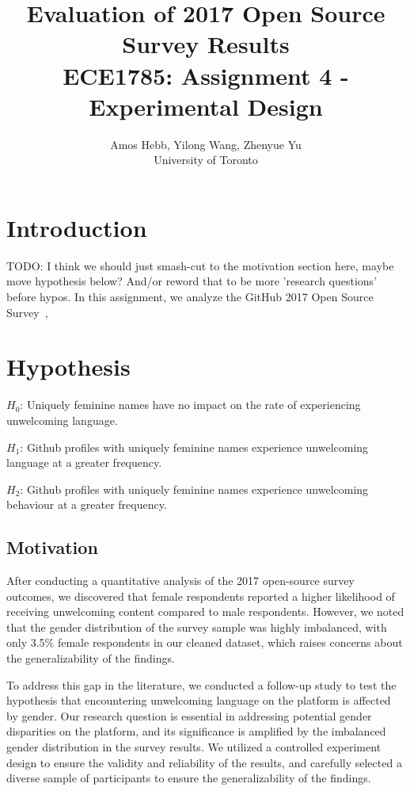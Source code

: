 \documentclass[journal,12pt,onecolumn,]{IEEEtran}
\begin{document}
\title{Evaluation of 2017 Open Source Survey Results \\
{\normalsize ECE1785: Assignment 4 - Experimental Design}}

\author{Amos Hebb, Yilong Wang, Zhenyue Yu\\ \small University of Toronto}

\maketitle

\section{Introduction}

TODO: I think we should just smash-cut to the motivation section here, maybe move hypothesis below? And/or reword that to be more 'research questions' before hypos.
In this assignment, we analyze the GitHub 2017 Open Source Survey~\cite{gitHubOpenSourceSurvey},

\section{Hypothesis}

$H_0$: Uniquely feminine names have no impact on the rate of experiencing unwelcoming language.

$H_1$: Github profiles with uniquely feminine names experience unwelcoming language at a greater frequency.

$H_2$: Github profiles with uniquely feminine names experience unwelcoming behaviour at a greater frequency.

\subsection{Motivation}

After conducting a quantitative analysis of the 2017 open-source survey outcomes, we discovered that female respondents reported a higher likelihood of receiving unwelcoming content compared to male respondents. However, we noted that the gender distribution of the survey sample was highly imbalanced, with only 3.5\% female respondents in our cleaned dataset, which raises concerns about the generalizability of the findings.

To address this gap in the literature, we conducted a follow-up study to test the hypothesis that encountering unwelcoming language on the platform is affected by gender. Our research question is essential in addressing potential gender disparities on the platform, and its significance is amplified by the imbalanced gender distribution in the survey results. We utilized a controlled experiment design to ensure the validity and reliability of the results, and carefully selected a diverse sample of participants to ensure the generalizability of the findings.
\end{document}
